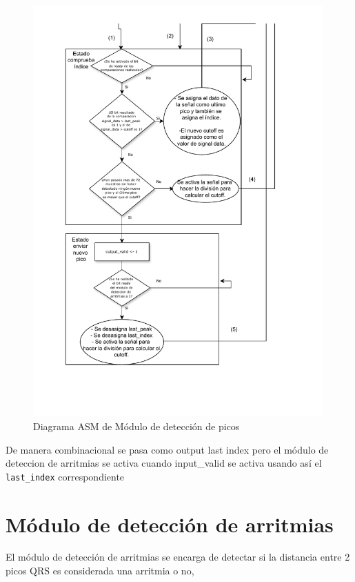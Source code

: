 \begin{figure}[h!]
    \centering
    \includegraphics[width=0.99\textwidth]{./Images/img_implementacion_hw/Diagramaasmpicos2.pdf}
    \caption{Diagrama ASM de Módulo de detección de picos}
    \label{fig:Diagramaasmpicos2}
\end{figure} 
\FloatBarrier
De manera combinacional se pasa como output last index pero el módulo de deteccion de arritmias se activa cuando input\_valid
se activa usando así el \lstinline{last_index} correspondiente 


\section{Módulo de detección de arritmias}

El módulo de detección de arritmias se encarga de detectar si la distancia entre 2 picos QRS es considerada una arritmia o no,
 
